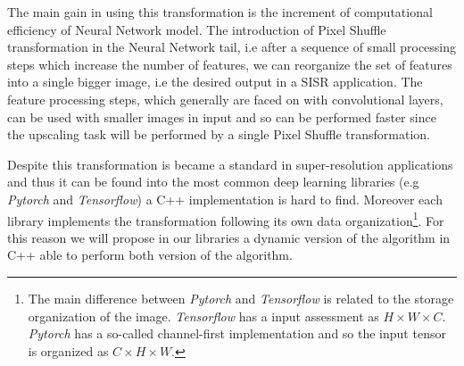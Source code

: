 \documentclass{standalone}
\begin{document}
The main gain in using this transformation is the increment of computational efficiency of Neural Network model.
The introduction of Pixel Shuffle transformation in the Neural Network tail, i.e after a sequence of small processing steps which increase the number of features, we can reorganize the set of features into a single bigger image, i.e the desired output in a SISR application.
The feature processing steps, which generally are faced on with convolutional layers, can be used with smaller images in input and so can be performed faster since the upscaling task will be performed by a single Pixel Shuffle transformation.

Despite this transformation is became a standard in super-resolution applications and thus it can be found into the most common deep learning libraries (e.g \emph{Pytorch} and \emph{Tensorflow}) a C++ implementation is hard to find.
Moreover each library implements the transformation following its own data organization\footnote{
  The main difference between \emph{Pytorch} and \emph{Tensorflow} is related to the storage organization of the image.
  \emph{Tensorflow} has a  input assessment as $H \times W \times C$.
  \emph{Pytorch} has a so-called channel-first implementation and so the input tensor is organized as $C \times H \times W$.
}.
For this reason we will propose in our libraries a dynamic version of the algorithm in C++ able to perform both version of the algorithm.
\end{document}
